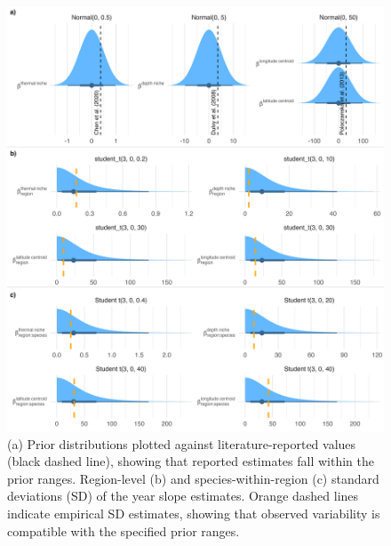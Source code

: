 \documentclass[11pt]{article}
\begin{document}
\newpage

\begin{figure}[h]
    \centering
        \includegraphics[scale=0.7]{images/prior_checks.png}
    \caption{(a) Prior distributions plotted against literature-reported values (black dashed line), showing that reported estimates fall within the prior ranges.
 Region-level (b) and species-within-region (c) standard deviations (SD) of the year slope estimates. Orange dashed lines indicate empirical SD estimates, showing that observed variability is compatible with the specified prior ranges.
}
    \label{fig:priors}
\end{figure}

\newpage
\end{document}
